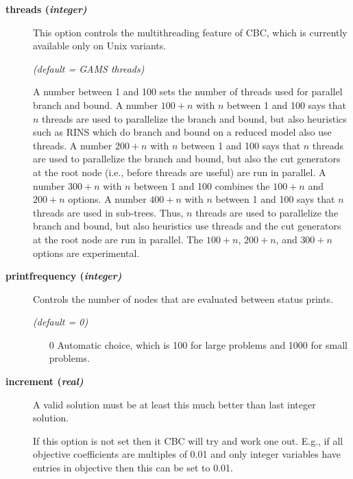 \begin{description}
\item[\label{threads}\hypertarget{threads}
{\textbf{threads (\slshape{integer})}}]\hspace{1.0in}

This option controls the multithreading feature of CBC, which is currently available only on Unix variants.

\textsl{(default = GAMS threads)}

A number between 1 and 100 sets the number of threads used for parallel branch and bound.
A number $100+n$ with $n$ between 1 and 100 says that $n$ threads are used to parallelize the branch and bound, but also heuristics such as RINS which do branch and bound on a reduced model also use threads.
A number $200+n$ with $n$ between 1 and 100 says that $n$ threads are used to parallelize the branch and bound, but also the cut generators at the root node (i.e., before threads are useful) are run in parallel.
A number $300+n$ with $n$ between 1 and 100 combines the $100+n$ and $200+n$ options.
A number $400+n$ with $n$ between 1 and 100 says that $n$ threads are used in sub-trees.
Thus, $n$ threads are used to parallelize the branch and bound, but also heuristics use threads and the cut generators at the root node are run in parallel.
The $100+n$, $200+n$, and $300+n$ options are experimental.


\item[\label{printfrequency}\hypertarget{printfrequency}
{\textbf{printfrequency (\slshape{integer})}}]\hspace{1.0in}

Controls the number of nodes that are evaluated between status prints.

\textsl{(default = 0)}
\begin{itemize}
\item[0] 
Automatic choice, which is 100 for large problems and 1000 for small problems.
\end{itemize}

\item[\label{increment}\hypertarget{increment}
{\textbf{increment (\slshape{real})}}]\hspace{1.0in}

A valid solution must be at least this much better than last integer solution.

If this option is not set then it CBC will try and work one out.
E.g., if all objective coefficients are multiples of 0.01 and only integer variables have entries in objective then this can be set to 0.01.


\end{description}
